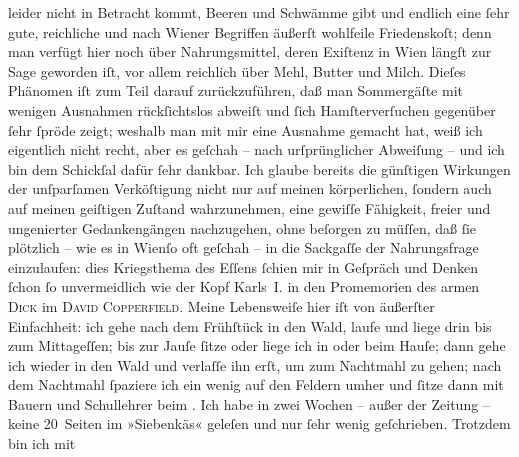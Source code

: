 \begin{ledgroupsized}[t]{13cm}
               leider nicht in Betracht kommt, Beeren und Schwämme gibt und endlich eine ſehr gute,
               reichliche und nach Wiener Begriffen äußerſt
               wohlfeile Friedenskoſt; denn man verfügt hier noch über Nahrungsmittel, deren
               Exiſtenz in Wien längſt zur Sage geworden iſt, vor
               allem reichlich über Mehl, Butter und Milch. Dieſes Phänomen iſt zum Teil darauf
               zurückzuführen, daß man Sommergäſte mit wenigen Ausnahmen rückſichtslos abweiſt und
               ſich Hamſterverſuchen gegenüber ſehr ſpröde zeigt; weshalb man mit mir eine Ausnahme
               gemacht hat, weiß ich eigentlich nicht recht, aber es geſchah – nach urſprünglicher
               Abweiſung – und ich bin dem Schickſal dafür ſehr dankbar. Ich glaube bereits die
               günſtigen Wirkungen der unſparſamen {\pb}Verköſtigung nicht nur auf meinen körperlichen, ſondern auch auf meinen geiſtigen
               Zuſtand wahrzunehmen, eine gewiſſe Fähigkeit, freier und ungenierter Gedankengängen
               nachzugehen, ohne beſorgen zu müſſen, daß ſie plötzlich – wie es in Wienſo oft geſchah – in die Sackgaſſe der Nahrungsfrage
               einzulaufen: dies Kriegsthema des Eſſens ſchien mir in Geſpräch und Denken ſchon ſo
               unvermeidlich wie der Kopf Karls I. in den Promemorien des armen \textsc{Dick} im \textsc{David Copperfield}.\pend
           \pstart
           Meine Lebensweiſe hier iſt von äußerſter Einfachheit: ich gehe nach dem Frühſtück in
               den Wald, laufe und liege drin bis zum Mittageſſen; bis zur Jauſe ſitze oder liege
               ich in oder beim Hauſe; dann gehe ich wieder in den Wald und verlaſſe ihn erſt, um
               zum Nachtmahl zu gehen; nach dem Nachtmahl ſpaziere ich ein wenig auf den Feldern
               umher und ſitze dann mit Bauern und Schul{\pb}lehrer beim \label{K_L02289_1v}\label{K_L02289_1h}. Ich habe in
               zwei Wochen – außer der Zeitung – keine 20 Seiten im »Siebenkäs« geleſen und nur ſehr wenig geſchrieben. Trotzdem bin ich mit

\end{ledgroupsized}
